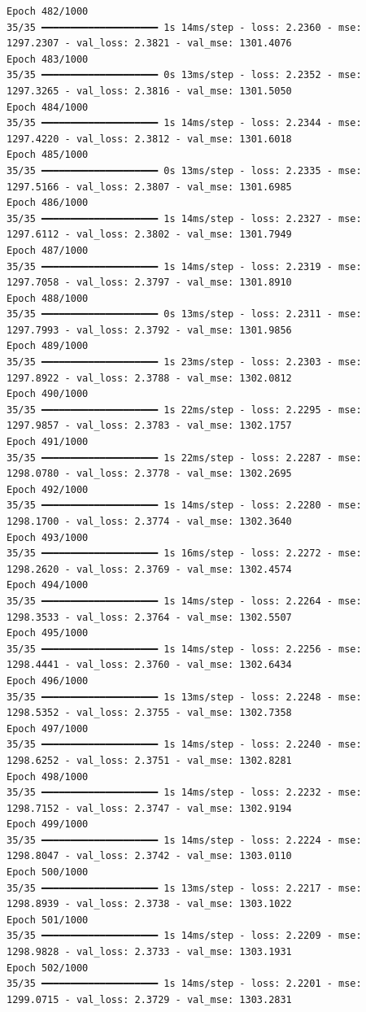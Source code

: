 \documentclass[
  letterpaper,
  DIV=11,
  numbers=noendperiod]{scrreprt}
\begin{document}
\begin{verbatim}
Epoch 482/1000
35/35 ━━━━━━━━━━━━━━━━━━━━ 1s 14ms/step - loss: 2.2360 - mse: 1297.2307 - val_loss: 2.3821 - val_mse: 1301.4076
Epoch 483/1000
35/35 ━━━━━━━━━━━━━━━━━━━━ 0s 13ms/step - loss: 2.2352 - mse: 1297.3265 - val_loss: 2.3816 - val_mse: 1301.5050
Epoch 484/1000
35/35 ━━━━━━━━━━━━━━━━━━━━ 1s 14ms/step - loss: 2.2344 - mse: 1297.4220 - val_loss: 2.3812 - val_mse: 1301.6018
Epoch 485/1000
35/35 ━━━━━━━━━━━━━━━━━━━━ 0s 13ms/step - loss: 2.2335 - mse: 1297.5166 - val_loss: 2.3807 - val_mse: 1301.6985
Epoch 486/1000
35/35 ━━━━━━━━━━━━━━━━━━━━ 1s 14ms/step - loss: 2.2327 - mse: 1297.6112 - val_loss: 2.3802 - val_mse: 1301.7949
Epoch 487/1000
35/35 ━━━━━━━━━━━━━━━━━━━━ 1s 14ms/step - loss: 2.2319 - mse: 1297.7058 - val_loss: 2.3797 - val_mse: 1301.8910
Epoch 488/1000
35/35 ━━━━━━━━━━━━━━━━━━━━ 0s 13ms/step - loss: 2.2311 - mse: 1297.7993 - val_loss: 2.3792 - val_mse: 1301.9856
Epoch 489/1000
35/35 ━━━━━━━━━━━━━━━━━━━━ 1s 23ms/step - loss: 2.2303 - mse: 1297.8922 - val_loss: 2.3788 - val_mse: 1302.0812
Epoch 490/1000
35/35 ━━━━━━━━━━━━━━━━━━━━ 1s 22ms/step - loss: 2.2295 - mse: 1297.9857 - val_loss: 2.3783 - val_mse: 1302.1757
Epoch 491/1000
35/35 ━━━━━━━━━━━━━━━━━━━━ 1s 22ms/step - loss: 2.2287 - mse: 1298.0780 - val_loss: 2.3778 - val_mse: 1302.2695
Epoch 492/1000
35/35 ━━━━━━━━━━━━━━━━━━━━ 1s 14ms/step - loss: 2.2280 - mse: 1298.1700 - val_loss: 2.3774 - val_mse: 1302.3640
Epoch 493/1000
35/35 ━━━━━━━━━━━━━━━━━━━━ 1s 16ms/step - loss: 2.2272 - mse: 1298.2620 - val_loss: 2.3769 - val_mse: 1302.4574
Epoch 494/1000
35/35 ━━━━━━━━━━━━━━━━━━━━ 1s 14ms/step - loss: 2.2264 - mse: 1298.3533 - val_loss: 2.3764 - val_mse: 1302.5507
Epoch 495/1000
35/35 ━━━━━━━━━━━━━━━━━━━━ 1s 14ms/step - loss: 2.2256 - mse: 1298.4441 - val_loss: 2.3760 - val_mse: 1302.6434
Epoch 496/1000
35/35 ━━━━━━━━━━━━━━━━━━━━ 1s 13ms/step - loss: 2.2248 - mse: 1298.5352 - val_loss: 2.3755 - val_mse: 1302.7358
Epoch 497/1000
35/35 ━━━━━━━━━━━━━━━━━━━━ 1s 14ms/step - loss: 2.2240 - mse: 1298.6252 - val_loss: 2.3751 - val_mse: 1302.8281
Epoch 498/1000
35/35 ━━━━━━━━━━━━━━━━━━━━ 1s 14ms/step - loss: 2.2232 - mse: 1298.7152 - val_loss: 2.3747 - val_mse: 1302.9194
Epoch 499/1000
35/35 ━━━━━━━━━━━━━━━━━━━━ 1s 14ms/step - loss: 2.2224 - mse: 1298.8047 - val_loss: 2.3742 - val_mse: 1303.0110
Epoch 500/1000
35/35 ━━━━━━━━━━━━━━━━━━━━ 1s 13ms/step - loss: 2.2217 - mse: 1298.8939 - val_loss: 2.3738 - val_mse: 1303.1022
Epoch 501/1000
35/35 ━━━━━━━━━━━━━━━━━━━━ 1s 14ms/step - loss: 2.2209 - mse: 1298.9828 - val_loss: 2.3733 - val_mse: 1303.1931
Epoch 502/1000
35/35 ━━━━━━━━━━━━━━━━━━━━ 1s 14ms/step - loss: 2.2201 - mse: 1299.0715 - val_loss: 2.3729 - val_mse: 1303.2831

\end{verbatim}
\end{document}
